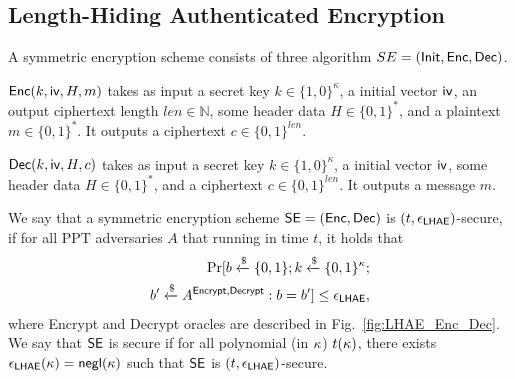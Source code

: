 \subsection{Length-Hiding Authenticated Encryption} \label{sec:SE}

A symmetric encryption scheme consists of three algorithm $SE = (\mathsf{Init}, \mathsf{Enc}, \mathsf{Dec})$.
\begin{itemize}
 \item{$\mathsf{Enc}(k,\mathsf{iv},H,m)$ takes as input a secret key $k \in \{1,0\}^{\kappa}$, a initial vector $\mathsf{iv}$, an output ciphertext length $len \in \mathbb{N}$, some header data $H \in \{0,1\}^{\ast}$, and a plaintext $m \in \{0,1\}^{\ast}$. It outputs a ciphertext $c \in \{0,1\}^{len}$.
 \item{$\mathsf{Dec}(k,\mathsf{iv},H,c)$ takes as input a secret key $k \in \{1,0\}^{\kappa}$, a initial vector $\mathsf{iv}$, some header data $H \in \{0,1\}^{\ast}$, and a ciphertext $c \in \{0,1\}^{len}$}. It outputs a message $m$.}
\end{itemize}

\begin{definition}
 We say that a symmetric encryption scheme $\mathsf{SE} = (\mathsf{Enc},\mathsf{Dec})$ is $(t, \epsilon_{\mathsf{LHAE}})$-secure, if for all PPT adversaries $A$ that running in time $t$, it holds that
 \begin{eqnarray}
  \Pr[b\xleftarrow{\$}\{0,1\}; k\xleftarrow{\$}\{0,1\}^{\kappa}; \nonumber \\
   b^{\prime} \xleftarrow{\$} A^{\mathsf{Encrypt}, \mathsf{Decrypt}} : b = b^{\prime}] \leq \epsilon_{\mathsf{LHAE}},
 \end{eqnarray}
where Encrypt and Decrypt oracles are described in Fig.~\ref{fig:LHAE_Enc_Dec}.
We say that $\mathsf{SE}$ is secure if
 for all polynomial (in $\kappa$) $t(\kappa)$,
 there exists $\epsilon_{\mathsf{LHAE}}(\kappa)=\mathsf{negl}(\kappa)$
 such that $\mathsf{SE}$ is $(t, \epsilon_{\mathsf{LHAE}})$-secure.

\end{definition}

